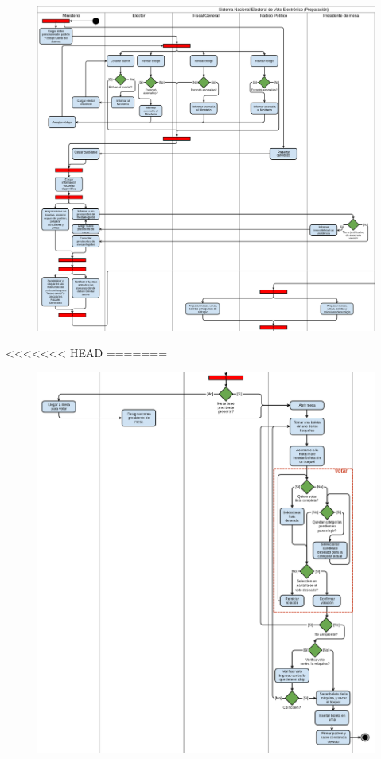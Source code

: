 \begin{figure}[h!]
\centering
\includegraphics[scale=0.5]{imagenes/actividad/actividadPreparacion1}
\end{figure}
<<<<<<< HEAD
=======

\begin{figure}[h!]
\centering
\includegraphics[scale=0.5]{imagenes/actividad/actividadPreparacion2}
\end{figure}

